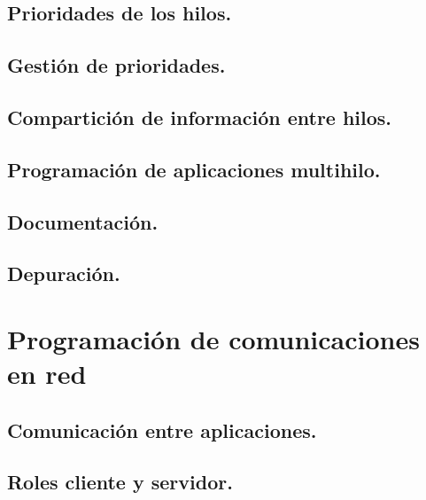 \documentclass[a4paper,12pt,spanish]{sphinxmanual}
\begin{document}
\section{Prioridades de los hilos.}
\label{textos/tema2:prioridades-de-los-hilos}

\section{Gestión de prioridades.}
\label{textos/tema2:gestion-de-prioridades}

\section{Compartición de información entre hilos.}
\label{textos/tema2:comparticion-de-informacion-entre-hilos}

\section{Programación de aplicaciones multihilo.}
\label{textos/tema2:programacion-de-aplicaciones-multihilo}

\section{Documentación.}
\label{textos/tema2:documentacion}

\section{Depuración.}
\label{textos/tema2:depuracion}

\chapter{Programación de comunicaciones en red}
\label{textos/tema3::doc}\label{textos/tema3:programacion-de-comunicaciones-en-red}

\section{Comunicación entre aplicaciones.}
\label{textos/tema3:comunicacion-entre-aplicaciones}

\section{Roles cliente y servidor.}
\label{textos/tema3:roles-cliente-y-servidor}
\end{document}

